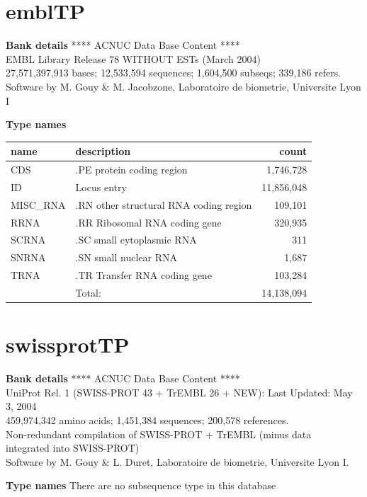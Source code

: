 \documentclass{article}
\begin{document}
\begin{Schunk}
\section{ emblTP }
\textbf{Bank details}
             ****     ACNUC Data Base Content      ****                         \\
              EMBL Library Release 78 WITHOUT ESTs  (March 2004)\\
27,571,397,913 bases; 12,533,594 sequences; 1,604,500 subseqs; 339,186 refers.\\
Software by M. Gouy \& M. Jacobzone, Laboratoire de biometrie, Universite Lyon I 

\textbf{Type names}
\noindent\begin{tabular}{llr}
\hline \hline
name & description & count \\
\hline
CDS  &  .PE protein coding region  &  1,746,728 \\
ID  &  Locus entry  &  11,856,048 \\
MISC\_RNA  &  .RN other structural RNA coding region  &  109,101 \\
RRNA  &  .RR Ribosomal RNA coding gene  &  320,935 \\
SCRNA  &  .SC small cytoplasmic RNA  &  311 \\
SNRNA  &  .SN small nuclear RNA  &  1,687 \\
TRNA  &  .TR Transfer RNA coding gene  &  103,284 \\
\hline
 & Total: & 14,138,094 \\
\hline \hline
\end{tabular}

\section{ swissprotTP }
\textbf{Bank details}
               ****     ACNUC Data Base Content      ****                       \\
  UniProt Rel. 1 (SWISS-PROT 43 + TrEMBL 26 + NEW): Last Updated: May  3, 2004\\
          459,974,342 amino acids; 1,451,384 sequences; 200,578 references.\\
          Non-redundant compilation of SWISS-PROT + TrEMBL (minus  data  \\
                     integrated  into  SWISS-PROT)\\
Software by M. Gouy \& L. Duret, Laboratoire de biometrie, Universite Lyon I.

\textbf{Type names}
There are no subsequence type in this database

\end{Schunk}
\end{document}
